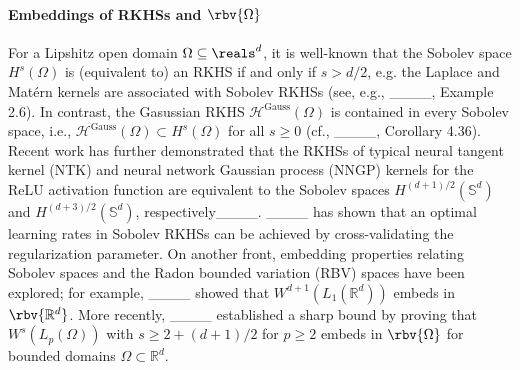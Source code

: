 \paragraph{Embeddings of RKHSs and $\rbv{\Omega}$} 
For a Lipshitz open domain $\Omega \subseteq \reals^d$, it is well-known that the Sobolev space \( H^s(\Omega) \) is (equivalent to) an RKHS if and only if \( s > d/2 \), e.g. the Laplace and Matérn kernels are associated with Sobolev RKHSs (see, e.g., ____, Example 2.6). In contrast, the Gasussian RKHS \( \mathcal{H}^{\text{Gauss}}(\Omega) \) is contained in every Sobolev space, i.e., \( \mathcal{H}^{\text{Gauss}}(\Omega) \subset H^s(\Omega) \) for all \( s \geq 0 \) (cf., ____, Corollary 4.36). %
Recent work has further demonstrated that the RKHSs of typical neural tangent kernel (NTK) and neural network Gaussian process (NNGP) kernels for the ReLU activation function are equivalent to the Sobolev spaces \( H^{(d+1)/2}(\mathbb{S}^d) \) and \( H^{(d+3)/2}(\mathbb{S}^d) \), respectively____. ____ has shown that an optimal learning rates in Sobolev RKHSs can be achieved by cross-validating the regularization parameter. On another front, embedding properties relating Sobolev spaces and the Radon bounded variation (RBV) spaces have been explored; for example, ____ showed that \( W^{d+1}(L_1(\mathbb{R}^d)) \) embeds in \( \rbv{\mathbb{R}^d} \). More recently, ____ established a sharp bound by proving that \( W^s(L_p(\Omega)) \) with \( s \geq 2 + (d+1)/2 \) for $p \ge 2$ embeds in \( \rbv{\Omega} \) for bounded domains \( \Omega \subset \mathbb{R}^d \). %


